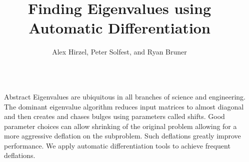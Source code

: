 \documentclass[final]{beamer}
\title{Finding Eigenvalues using Automatic Differentiation} %
\author{Alex Hirzel, Peter Solfest, and Ryan Bruner} %
\institute{Michigan Technological University} %
\newlength{\sepwid}
\newlength{\onecolwid}
\begin{document}

\setlength{\belowcaptionskip}{2ex} %
\setlength\belowdisplayshortskip{2ex} %

\begin{frame}[t] %

\begin{columns}[t] %

\begin{column}{\sepwid}\end{column} %

\begin{column}{\onecolwid} %


\begin{block}{Abstract}
{
\small
Eigenvalues are ubiquitous in all branches of science and engineering. The
dominant eigenvalue algorithm reduces input matrices to almost diagonal and then
creates and chases bulges using parameters called shifts. Good parameter choices
can allow shrinking of the original problem allowing for a more aggressive
deflation on the subproblem. Such deflations greatly improve performance. We
apply automatic differentiation tools to achieve frequent deflations.
}
\end{block}



\end{column}
\end{columns}
\end{frame}
\end{document}
